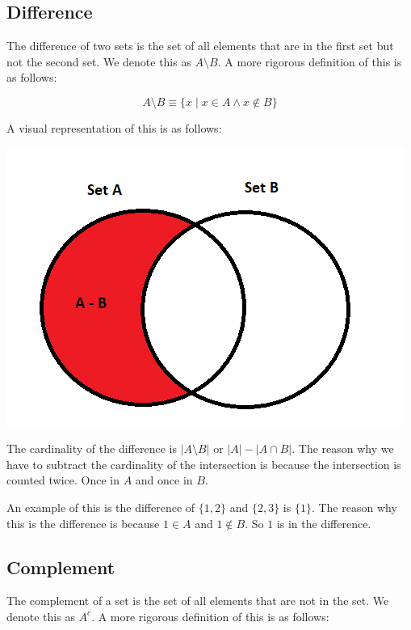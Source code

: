\documentclass[11pt]{article}
\begin{document}
\subsection{Difference}
\label{sec:org05a9e62}
The difference of two sets is the set of all elements that are in the first set but not the second set. We denote this as \(A \setminus B\). A more rigorous definition of this is as follows:

\[
A \setminus B \equiv \{x \mid x \in A \land x \notin B\}
\]

A visual representation of this is as follows:


\begin{center}
\includegraphics[width=.9\linewidth]{Set_Theory/2022-12-06_09-56-18_Set-Difference.png}
\end{center}



The cardinality of the difference is \(|A \setminus B|\) or \(|A| - |A \cap B|\). The reason why we have to subtract the cardinality of the intersection is because the intersection is counted twice. Once in \(A\) and once in \(B\).

An example of this is the difference of \(\{1,2\}\) and \(\{2,3\}\) is \(\{1\}\). The reason why this is the difference is because \(1 \in A\) and \(1 \notin B\). So \(1\) is in the difference.

\subsection{Complement}
\label{sec:org653668c}
The complement of a set is the set of all elements that are not in the set. We denote this as \(A^c\). A more rigorous definition of this is as follows:
\end{document}

